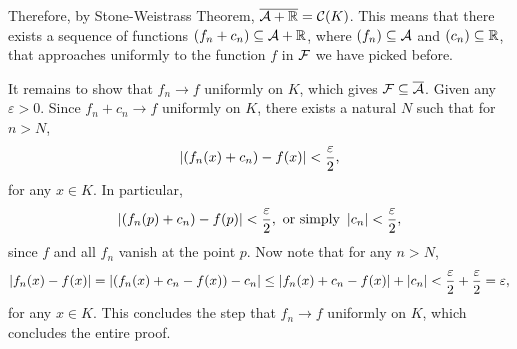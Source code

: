 \documentclass[12pt]{article}
\begin{document}
\begin{fproof}[4]
Therefore, by Stone-Weistrass Theorem, \(\overline{\mathcal{A} + \mathbb {R}} = \mathcal{C}(K)\). This means that there exists a sequence of functions \((f_n + c_n) \subseteq \mathcal{A} + \mathbb {R}\), where \((f_n) \subseteq \mathcal{A}\) and \((c_n) \subseteq \mathbb {R}\), that approaches uniformly to the function \(f\) in \(\mathcal{F}\) we have picked before.

It remains to show that \(f_n \to f\) uniformly on \(K\), which gives \(\mathcal{F} \subseteq \overline{\mathcal{A}}\).
Given any \(\varepsilon > 0\).
Since \(f_n + c_n \to f\) uniformly on \(K\), there exists a natural \(N\) such that for \(n > N\),
\begin{align*}
    \left\lvert (f_n(x) + c_n) - f(x) \right\rvert < \frac{\varepsilon}{2},
\end{align*}
for any \(x \in K\).
In particular,
\begin{align*}
    \left\lvert (f_n(p) + c_n) - f(p) \right\rvert < \frac{\varepsilon}{2}, \text{ or simply } \left\lvert c_n \right\rvert < \frac{\varepsilon}{2},
\end{align*}
since \(f\) and all \(f_n\) vanish at the point \(p\).
Now note that for any \(n > N\),
\begin{align*}
    \left\lvert f_n(x) - f(x) \right\rvert = \left\lvert (f_n(x) + c_n - f(x)) - c_n \right\rvert \leq \left\lvert f_n(x) + c_n - f(x) \right\rvert + \left\lvert c_n \right\rvert < \frac{\varepsilon}{2} + \frac{\varepsilon}{2} = \varepsilon,
\end{align*}
for any \(x \in K\).
This concludes the step that \(f_n \to f\) uniformly on \(K\), which concludes the entire proof.
\end{fproof}
\newpage

\begin{fproof}[5]

\end{fproof}
\end{document}
